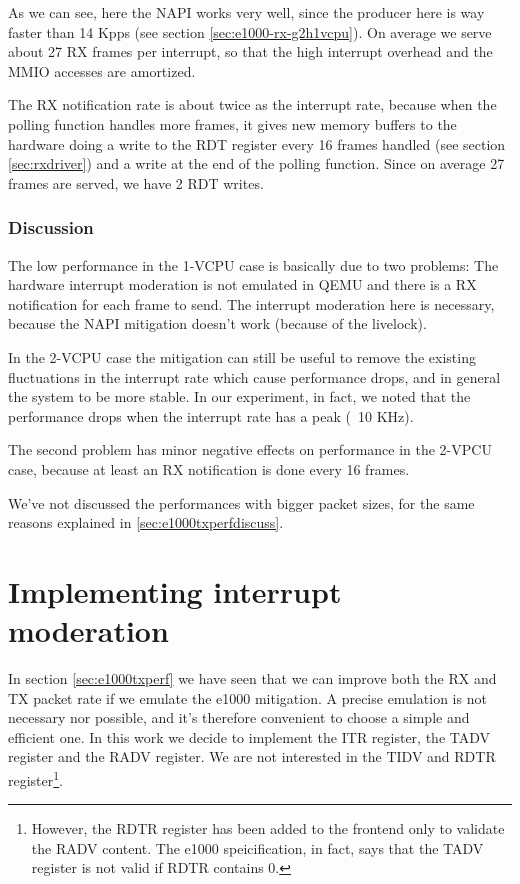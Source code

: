As we can see, here the NAPI works very well, since the producer here is way faster than 14 Kpps (see section \ref{sec:e1000-rx-g2h1vcpu}).
On average we serve about 27 RX frames per interrupt, so that the high interrupt overhead and the MMIO accesses are amortized.

The RX notification rate is about twice as the interrupt rate, because when the polling function handles more frames, it gives new memory
buffers to the hardware doing a write to the RDT register every 16 frames handled (see section \ref{sec:rxdriver}) and a write at the end
of the polling function. Since on average 27 frames are served, we have 2 RDT writes.


\subsubsection{Discussion}
The low performance in the 1-VCPU case is basically due to two problems: The hardware interrupt moderation is not emulated in QEMU and
there is a RX notification for each frame to send. The interrupt moderation here is necessary, because the NAPI mitigation doesn't work
(because of the livelock).

In the 2-VCPU case the mitigation can still be useful to remove the existing fluctuations in the interrupt rate which cause performance
drops, and in general the system to be more stable. In our experiment, in fact, we noted that the performance drops when the interrupt
rate has a peak (~10 KHz).

The second problem has minor negative effects on performance in the 2-VPCU case, because at least an RX notification is done every
16 frames.

\vspace{0.5cm}

We've not discussed the performances with bigger packet sizes, for the same reasons explained in \ref{sec:e1000txperfdiscuss}.



\section{Implementing interrupt moderation}
\label{sec:e1000-mit}
In section \ref{sec:e1000txperf} we have seen that we can improve both the RX and TX packet rate if we emulate the e1000 mitigation.
A precise emulation is not necessary nor possible, and it's therefore convenient to choose a simple and efficient one.
In this work we decide to implement the ITR register, the TADV register and the RADV register.
We are not interested in the TIDV and RDTR register\footnote{However, the RDTR register has been added to the frontend only to 
validate the RADV content. The e1000 speicification, in fact, says that the TADV register is not valid if RDTR contains 0.}.

